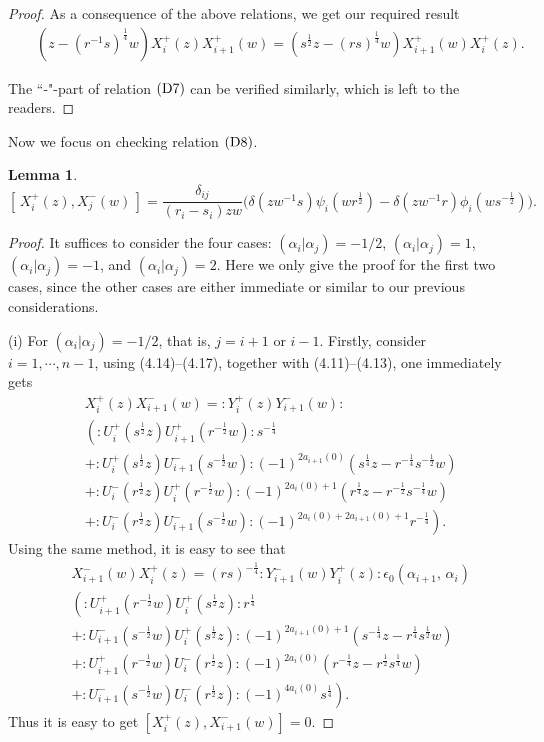 \documentclass{amsproc}
\newtheorem{lemm}[theo]{Lemma}
\theoremstyle{remark}
\numberwithin{equation}{section}
\begin{document}
\begin{proof}
As a consequence of the above relations, we get our required result
\begin{eqnarray*}
&&(z-(r^{-1}s)^{\frac{1}{4}}w)X_i^+(z)X_{i+1}^+(w)
=(s^{\frac{1}{2}}z-(rs)^{\frac{1}{4}}w)X_{i+1}^+(w)X_{i}^+(z).
\end{eqnarray*}

The ``-"-part of relation $({\rm D}7)$ can be verified similarly, which is left to the readers.
\end{proof}

Now we focus on checking relation $({\rm D}8)$.
\begin{lemm}
$$[\,X_i^+(z),
X_j^-(w)\,]=\frac{\delta_{ij}}{(r_i-s_i)zw}\Big(\delta(zw^{-1}s)\psi_i(wr^{\frac{1}2})
-\delta(zw^{-1}r)\phi_i(ws^{-\frac1{2}})\Big).$$
\end{lemm}
\begin{proof} It suffices to consider the four
cases: $({\alpha}_i|{\alpha}_j)=-1/2$, $({\alpha}_i|{\alpha}_j)=1$,  $({\alpha}_i|{\alpha}_j)=-1$, and
$({\alpha}_i|{\alpha}_j)=2$. Here we only give the proof for the first two cases,
since the other cases are either immediate or similar to our
previous considerations.

(i) For $({\alpha}_i|{\alpha}_j)=-1/2$, that is, $j=i+1$ or $i-1$. Firstly, consider $i=1,\cdots, n-1$,
using (4.14)--(4.17), together with (4.11)--(4.13), one immediately gets
\begin{eqnarray*}
&&X^+_i(z)X_{i+1}^-(w)=:Y_i^+(z)Y_{i+1}^-(w):\\
&&\left(:U_i^+(s^{\frac{1}{2}}z)U_{i+1}^+(r^{-\frac{1}{2}}w):s^{-\frac{1}{4}}\right. \\
&&+:U_i^+(s^{\frac{1}{2}}z)U_{i+1}^-(s^{-\frac{1}{2}}w):(-1)^{2a_{i+1}(0)}
(s^{\frac{1}{4}}z-r^{-\frac{1}{4}}s^{-\frac{1}{2}}w)\\
&&+:U_i^-(r^{\frac{1}{2}}z)U_i^+(r^{-\frac{1}{2}}w):(-1)^{2a_i(0)+1}
(r^{\frac{1}{4}}z-r^{-\frac{1}{2}}s^{-\frac{1}{4}}w) \\
&&+\left.:U_i^-(r^{\frac{1}{2}}z)U_{i+1}^-(s^{-\frac{1}{2}}w):(-1)^{2a_i(0)+2a_{i+1}(0)+1}r^{-\frac{1}{4}}\right).
\end{eqnarray*}
Using the same method, it is easy to see that
\begin{eqnarray*}
&&X_{i+1}^-(w)X^+_i(z)=(rs)^{-\frac{1}{4}}
:Y_{i+1}^-(w)Y_i^+(z):\epsilon_0(\alpha_{i+1},\,\alpha_{i})\\
&&\left(:U_{i+1}^+(r^{-\frac{1}{2}}w)U_i^+(s^{\frac{1}{2}}z):r^{\frac{1}{4}}\right. \\
&&+:U_{i+1}^-(s^{-\frac{1}{2}}w)U_i^+(s^{\frac{1}{2}}z):(-1)^{2a_{i+1}(0)+1}
(s^{-\frac{1}{4}}z-r^{\frac{1}{4}}s^{\frac{1}{2}}w) \\
&&+:U_{i+1}^+(r^{-\frac{1}{2}}w)U_i^-(r^{\frac{1}{2}}z):(-1)^{2a_i(0)}
(r^{-\frac{1}{4}}z-r^{\frac{1}{2}}s^{\frac{1}{4}}w) \\
&&+\left.:U_{i+1}^-(s^{-\frac{1}{2}}w)U_i^-(r^{\frac{1}{2}}z):(-1)^{4a_i(0)}s^{\frac{1}{4}}\right).
\end{eqnarray*}
Thus it is easy to get  $[X^+_{i}(z), X^-_{i+1}(w)]=0.$
\smallskip


\end{proof}
\end{document}
